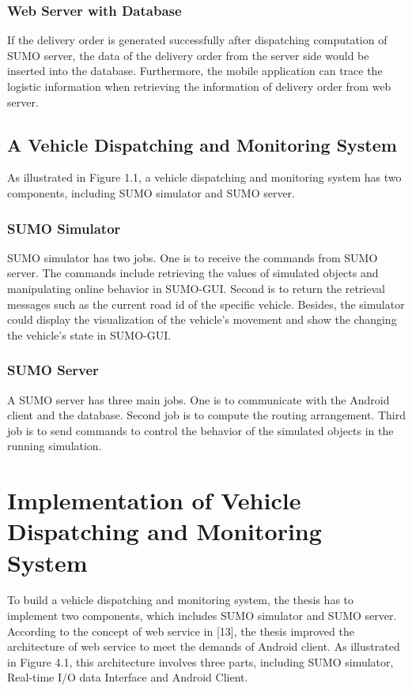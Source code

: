 \documentclass[12pt]{ksthesis}
\begin{document}
\begin{thesis}
{\subsection{Web Server with Database}
If the delivery order is generated successfully after dispatching computation of SUMO server, the data of the delivery order from the server side would be inserted into the database. Furthermore, the mobile application can trace the logistic information when retrieving the information of delivery order from web server.

\section{A Vehicle Dispatching and Monitoring System}
As illustrated in Figure 1.1, a vehicle dispatching and monitoring system has two components, including SUMO simulator and SUMO server.



\subsection{SUMO Simulator}
SUMO simulator has two jobs. One is to receive the commands from SUMO server. The commands include retrieving the values of simulated objects and manipulating online behavior in SUMO-GUI. Second is to return the retrieval messages such as the current road id of the specific vehicle. Besides, the simulator could display the visualization of the vehicle’s movement and show the changing the vehicle’s state in SUMO-GUI.

\subsection{SUMO Server}
A SUMO server has three main jobs. One is to communicate with the Android client and the database. Second job is to compute the routing arrangement. Third job is to send commands to control the behavior of the simulated objects in the running simulation.

\chapter{Implementation of Vehicle Dispatching and Monitoring System }\label{Chap:Architecture}

To build a vehicle dispatching and monitoring system, the thesis has to implement two components, which includes SUMO simulator and SUMO server. According to the concept of web service in [13], the thesis improved the architecture of web service to meet the demands of Android client.
As illustrated in Figure 4.1, this architecture involves three parts, including SUMO simulator, Real-time I/O data Interface and Android Client.

}
\end{thesis}
\end{document}
